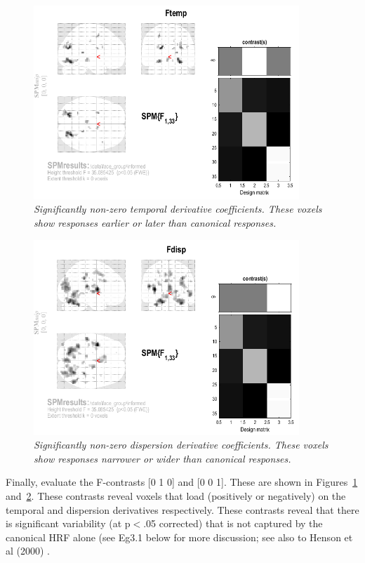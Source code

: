 \documentclass[a4paper,titlepage]{book}
\begin{document}
\begin{figure}
\begin{center}
\includegraphics[width=100mm]{faces_group/Ftemp}
\caption{\em Significantly non-zero temporal derivative coefficients. These voxels show responses earlier or later than canonical responses. \label{informed_Ftemp}}
\end{center}
\end{figure}
\begin{figure}
\begin{center}
\includegraphics[width=100mm]{faces_group/Fdisp}
\caption{\em Significantly non-zero dispersion derivative coefficients. These voxels show responses narrower or wider than canonical responses. \label{informed_Fdisp}}
\end{center}
\end{figure}

	Finally, evaluate the F-contrasts [0 1 0] and [0 0 1]. These 
	are shown in Figures~\ref{informed_Ftemp} and~\ref{informed_Fdisp}.
These contrasts reveal voxels that load (positively or negatively) on the temporal and dispersion derivatives respectively. These contrasts reveal that there is significant variability (at p$<$.05 corrected) that is not captured by the canonical HRF alone (see Eg3.1 below for more discussion; see also to Henson et al (2000) \cite{rnah_basis}.
\end{document}
